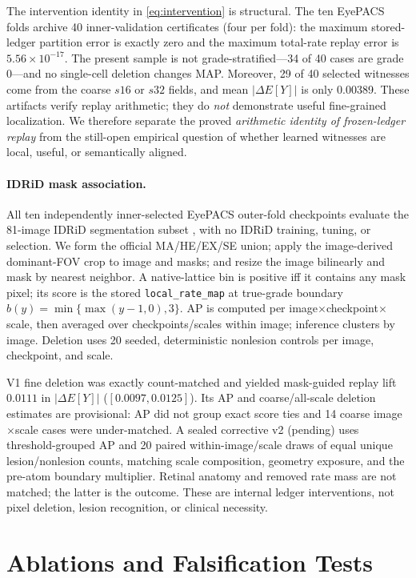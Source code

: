 \documentclass[10pt,twocolumn,letterpaper]{article}
\begin{document}
The intervention identity in \cref{eq:intervention} is structural.  The ten
EyePACS folds archive 40 inner-validation certificates (four per fold): the
maximum stored-ledger partition error is exactly zero and the maximum total-rate
replay error is $5.56\times10^{-17}$.  The present sample is not
grade-stratified---34 of 40 cases are grade 0---and no single-cell deletion
changes MAP.  Moreover, 29 of 40 selected witnesses come from the coarse $s16$
or $s32$ fields, and mean $|\Delta E[Y]|$ is only 0.00389.  These artifacts
verify replay arithmetic; they do \emph{not} demonstrate useful fine-grained
localization.  We therefore separate the proved \emph{arithmetic identity of
frozen-ledger replay} from the still-open empirical question of whether learned
witnesses are local, useful, or semantically aligned.

\paragraph{IDRiD mask association.}
All ten independently inner-selected EyePACS outer-fold checkpoints evaluate
the 81-image IDRiD segmentation subset \cite{porwal2020idrid}, with no IDRiD
training, tuning, or selection.  We form the official MA/HE/EX/SE union; apply
the image-derived dominant-FOV crop to image and masks; and resize the image
bilinearly and mask by nearest neighbor.  A native-lattice bin is positive iff
it contains any mask pixel; its score is the stored \texttt{local\_rate\_map}
at true-grade boundary $b(y)=\min\{\max(y-1,0),3\}$.  AP is computed per
image$\times$checkpoint$\times$scale, then averaged over checkpoints/scales
within image; inference clusters by image.  Deletion uses 20 seeded,
deterministic nonlesion controls per image, checkpoint, and scale.

V1 fine deletion was exactly count-matched and yielded mask-guided replay lift
$0.0111$ in $|\Delta E[Y]|$ ($[0.0097,0.0125]$).  Its AP and coarse/all-scale
deletion estimates are provisional: AP did not group exact score ties and 14
coarse image$\times$scale cases were under-matched.  A sealed corrective v2
(pending) uses threshold-grouped AP and 20 paired within-image/scale draws of
equal unique lesion/nonlesion counts, matching scale composition, geometry
exposure, and the pre-atom boundary multiplier.  Retinal anatomy and removed
rate mass are not matched; the latter is the outcome.  These are internal
ledger interventions, not pixel deletion, lesion recognition, or clinical
necessity.

\section{Ablations and Falsification Tests}
\label{sec:ablations}
\end{document}
